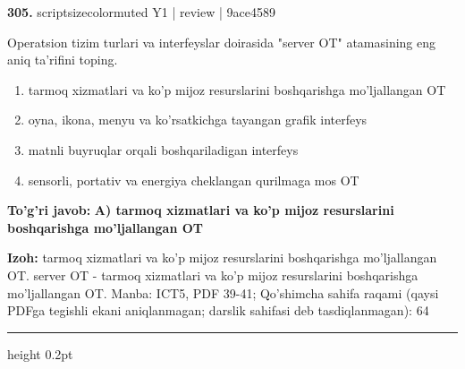 \documentclass[10pt,a4paper]{article}
\begin{document}
{\bfseries\sffamily\color{ink} 305.} {scriptsizecolor{muted} Y1 | review | 9ace4589}
\par
Operatsion tizim turlari va interfeyslar doirasida "server OT" atamasining eng aniq ta'rifini toping.
\begin{enumerate}[label=\Alph*),leftmargin=9mm]
\item tarmoq xizmatlari va ko'p mijoz resurslarini boshqarishga mo'ljallangan OT
\item oyna, ikona, menyu va ko'rsatkichga tayangan grafik interfeys
\item matnli buyruqlar orqali boshqariladigan interfeys
\item sensorli, portativ va energiya cheklangan qurilmaga mos OT
\end{enumerate}
\begin{tcolorbox}[enhanced,breakable,colback=teal!4,colframe=teal!60!black,boxrule=0.45pt,arc=1.2mm,left=2.7mm,right=2.7mm,top=1.8mm,bottom=1.8mm,before skip=2mm,after skip=2mm]
{\bfseries\sffamily\color{teal}To'g'ri javob:} \textbf{A) tarmoq xizmatlari va ko'p mijoz resurslarini boshqarishga mo'ljallangan OT}
\par\smallskip
{\bfseries Izoh:} tarmoq xizmatlari va ko'p mijoz resurslarini boshqarishga mo'ljallangan OT. server OT - tarmoq xizmatlari va ko'p mijoz resurslarini boshqarishga mo'ljallangan OT. Manba: ICT5, PDF 39-41; Qo'shimcha sahifa raqami (qaysi PDFga tegishli ekani aniqlanmagan; darslik sahifasi deb tasdiqlanmagan): 64
\end{tcolorbox}
\vspace{2mm}\hrule height 0.2pt\vspace{3mm}
\end{document}
